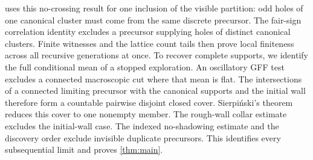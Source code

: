  uses this no-crossing result for one inclusion
of the visible partition: odd holes of one canonical cluster must come from
the same discrete precursor. The fair-sign correlation identity excludes a
precursor supplying holes of distinct canonical clusters. Finite witnesses
and the lattice count tails then prove local finiteness across all recursive
generations at once. To recover complete supports, we identify the full
conditional mean of a stopped exploration. An oscillatory GFF test excludes
a connected macroscopic cut where that mean is flat. The intersections of a
connected limiting precursor with the canonical supports and the initial wall
therefore form a countable pairwise disjoint closed cover. Sierpi\'nski's theorem
reduces this cover to one nonempty member. The rough-wall collar estimate
excludes the initial-wall case. The indexed no-shadowing estimate
and the discovery order exclude invisible duplicate precursors. This identifies
every subsequential limit and proves \cref{thm:main}.
